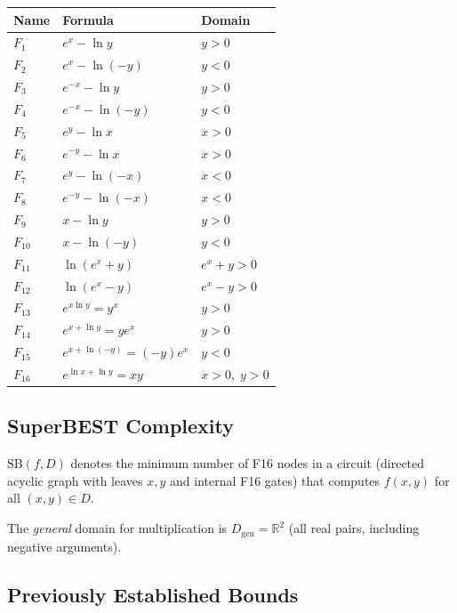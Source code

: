 \documentclass[12pt]{article}
\theoremstyle{definition}
\begin{document}
\begin{center}
\begin{tabular}{lll}
\toprule
Name & Formula & Domain \\
\midrule
$F_1$ & $e^x - \ln y$ & $y > 0$ \\
$F_2$ & $e^x - \ln(-y)$ & $y < 0$ \\
$F_3$ & $e^{-x} - \ln y$ & $y > 0$ \\
$F_4$ & $e^{-x} - \ln(-y)$ & $y < 0$ \\
$F_5$ & $e^y - \ln x$ & $x > 0$ \\
$F_6$ & $e^{-y} - \ln x$ & $x > 0$ \\
$F_7$ & $e^y - \ln(-x)$ & $x < 0$ \\
$F_8$ & $e^{-y} - \ln(-x)$ & $x < 0$ \\
$F_9$ & $x - \ln y$ & $y > 0$ \\
$F_{10}$ & $x - \ln(-y)$ & $y < 0$ \\
$F_{11}$ & $\ln(e^x + y)$ & $e^x + y > 0$ \\
$F_{12}$ & $\ln(e^x - y)$ & $e^x - y > 0$ \\
$F_{13}$ & $e^{x \ln y} = y^x$ & $y > 0$ \\
$F_{14}$ & $e^{x + \ln y} = ye^x$ & $y > 0$ \\
$F_{15}$ & $e^{x + \ln(-y)} = (-y)e^x$ & $y < 0$ \\
$F_{16}$ & $e^{\ln x + \ln y} = xy$ & $x > 0,\; y > 0$ \\
\bottomrule
\end{tabular}
\end{center}

\subsection{SuperBEST Complexity}

$\mathrm{SB}(f, D)$ denotes the minimum number of F16 nodes in a circuit
(directed acyclic graph with leaves $x, y$ and internal F16 gates) that computes
$f(x, y)$ for all $(x, y) \in D$.

The \emph{general} domain for multiplication is $D_{\mathrm{gen}} = \mathbb{R}^2$
(all real pairs, including negative arguments).

\subsection{Previously Established Bounds}
\end{document}
